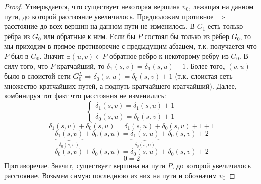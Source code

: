 \begin{proof}
    Утверждается, что существует некоторая вершина $v_0$, лежащая на данном пути, до которой расстояние увеличилось.
    Предположим противное $\Rightarrow$ расстояние до всех вершин на данном пути не изменилось. В $G_1$ есть только рёбра из $G_0$ или обратные к ним.
    Если бы $P$ состоял бы только из рёбер $G_0$, то мы приходим в прямое противоречие с предыдущим абзацем, т.к. получается что $P$ был в $G_0$. Значит $\exists (u, v) \in P$ обратное ребро к некоторому ребру из $G_0$.
    В силу того, что $P$ кратчайший, то $\delta_1(s, v) = \delta_1(s, u) + 1$.
    Более того, $(v, u)$ было в слоистой сети $G^L_0 \Rightarrow \delta_0(s, u) = \delta_0(s, v) + 1$ (т.к. слоистая сеть -- множество кратчайших путей, а подпуть кратчайшего кратчайший). Далее, комбинируя тот факт что расстояния не изменились:
    \begin{equation*}
        \begin{cases}
            \delta_1(s, v) = \delta_1(s, u) + 1 \\
            \delta_0(s, u) = \delta_0(s, v) + 1
        \end{cases}    
    \end{equation*}
    \begin{equation*}
            \delta_1(s, v) + \delta_0(s, u) = \delta_1(s, u) + \delta_0(s, v) + 1 + 1
    \end{equation*}
    \begin{equation*}
            \underbrace{\delta_1(s, v)}_{\delta_0(s, v)} + \delta_0(s, u) = \underbrace{\delta_1(s, u)}_{\delta_0(s, u)} + \delta_0(s, v) + 2
    \end{equation*}
    \begin{equation*}
            \delta_0(s, v) + \delta_0(s, u) = \delta_0(s, u) + \delta_0(s, v) + 2
    \end{equation*}
    \begin{equation*}
            0 = 2
    \end{equation*}
    Противоречие. Значит, существует вершина на пути $P$, до которой увеличилось расстояние. Возьмем самую последнюю из них на пути и обозначим $v_0$


\end{proof}

